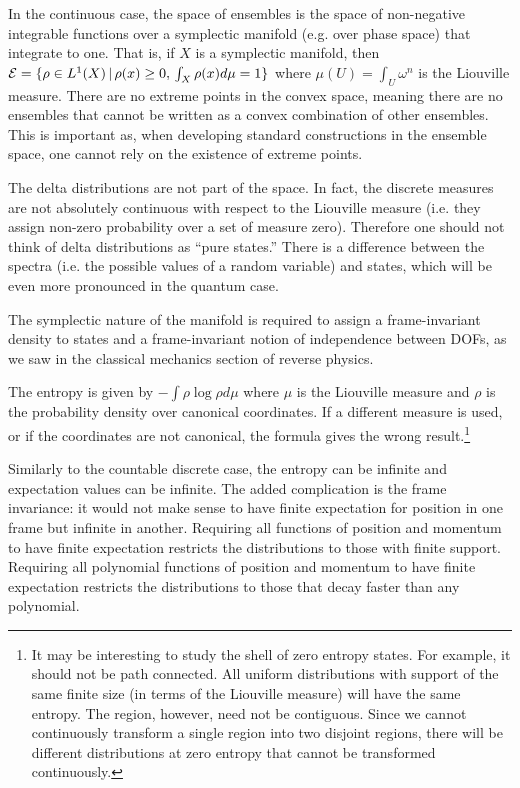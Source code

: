 In the continuous case, the space of ensembles is the space of non-negative integrable functions over a symplectic manifold (e.g.  over phase space) that integrate to one. That is, if $X$ is a symplectic manifold, then $\mathcal{E} = \{ \rho \in L^1(X) \, | \, \rho(x) \geq 0, \, \int_X \rho(x) d\mu = 1 \} $ where $\mu(U)=\int_U \omega^n$ is the Liouville measure. There are no extreme points in the convex space, meaning there are no ensembles that cannot be written as a convex combination of other ensembles. This is important as, when developing standard constructions in the ensemble space, one cannot rely on the existence of extreme points.

The delta distributions are not part of the space. In fact, the discrete measures are not absolutely continuous with respect to the Liouville measure (i.e. they assign non-zero probability over a set of measure zero). Therefore one should not think of delta distributions as ``pure states.'' There is a difference between the spectra (i.e. the possible values of a random variable) and states, which will be even more pronounced in the quantum case.

The symplectic nature of the manifold is required to assign a frame-invariant density to states and a frame-invariant notion of independence between DOFs, as we saw in the classical mechanics section of reverse physics.

The entropy is given by $- \int \rho \log \rho d\mu$ where $\mu$ is the Liouville measure and $\rho$ is the probability density over canonical coordinates. If a different measure is used, or if the coordinates are not canonical, the formula gives the wrong result.\footnote{It may be interesting to study the shell of zero entropy states. For example, it should not be path connected. All uniform distributions with support of the same finite size (in terms of the Liouville measure) will have the same entropy. The region, however, need not be contiguous. Since we cannot continuously transform a single region into two disjoint regions, there will be different distributions at zero entropy that cannot be transformed continuously.}


Similarly to the countable discrete case, the entropy can be infinite and expectation values can be infinite. The added complication is the frame invariance: it would not make sense to have finite expectation for position in one frame but infinite in another. Requiring all functions of position and momentum to have finite expectation restricts the distributions to those with finite support. Requiring all polynomial functions of position and momentum to have finite expectation restricts the distributions to those that decay faster than any polynomial.

